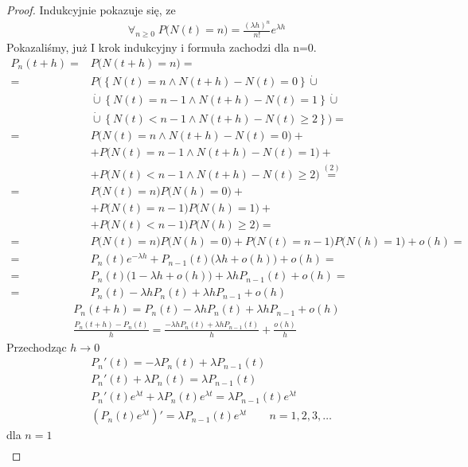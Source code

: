 \begin{proof}
Indukcyjnie pokazuje się, ze
\begin{gather*}
\forall_{n\ge0}\;
P\bigl(N(t)=n\bigr)=
\frac{(\lambda h)^n}{n!}e^{\lambda h}
\end{gather*}
Pokazaliśmy, już I krok indukcyjny i formuła zachodzi dla n=0.
\begin{align*}
P_n(t+h)=&
P\bigl(N(t+h)=n\bigr)
=\\=&
P\bigl(
\left\{N(t)=n\wedge N(t+h)-N(t)=0\right\}
\dot{\cup}\\&\dot{\cup}
\left\{N(t)=n-1\wedge N(t+h)-N(t)=1\right\}
\dot{\cup}\\&\dot{\cup}
\left\{N(t)<n-1\wedge N(t+h)-N(t)\ge2\right\}
\bigr)
=\\=&
P\bigl(N(t)=n\wedge N(t+h)-N(t)=0\bigr)
+\\&+
P\bigl(N(t)=n-1\wedge N(t+h)-N(t)=1\bigr)
+\\&+
P\bigl(N(t)<n-1\wedge N(t+h)-N(t)\ge2\bigr)
\stackrel{(2)}{=}\\=&
P\bigl(N(t)=n\bigr) P\bigl( N(h)=0\bigr)
+\\&+
P\bigl(N(t)=n-1\bigr) P\bigl( N(h)=1\bigr)
+\\&+
P\bigl(N(t)<n-1\bigr) P\bigl(N(h)\ge2\bigr)
=\\=&
P\bigl(N(t)=n\bigr) P\bigl( N(h)=0\bigr)
+
P\bigl(N(t)=n-1\bigr) P\bigl( N(h)=1\bigr)
+
o(h)
=\\=&
P_n(t)e^{-\lambda h}+P_{n-1}(t)\bigl(\lambda h+o(h)\bigr)+o(h)
=\\=&
P_n(t)\bigl(1-\lambda h+o(h)\bigr)+\lambda hP_{n-1}(t)+o(h)
=\\=&
P_n(t)-\lambda hP_n(t)+\lambda hP_{n-1}+o(h)
\end{align*}
\begin{gather*}
P_n(t+h)=P_n(t)-\lambda hP_n(t)+\lambda hP_{n-1}+o(h)\\
\frac{P_n(t+h)-P_n(t)}{h}=\frac{-\lambda hP_n(t)+\lambda hP_{n-1}(t)}{h}+\frac{o(h)}{h}
\end{gather*}
Przechodząc $ h\to0 $
\begin{align*}
&P_n'(t)=-\lambda P_n(t)+\lambda P_{n-1}(t)\\
&P_n'(t)+\lambda P_n(t)=\lambda P_{n-1}(t)\\
&P_n'(t)e^{\lambda t}+\lambda P_n(t)e^{\lambda t}=\lambda P_{n-1}(t)e^{\lambda t}\\
&\left(P_n(t)e^{\lambda t}\right)'=\lambda P_{n-1}(t)e^{\lambda t}\qquad n=1,2,3,\dots
\end{align*} 
dla $ n=1 $
\begin{gather*}

\end{gather*}
\end{proof}
